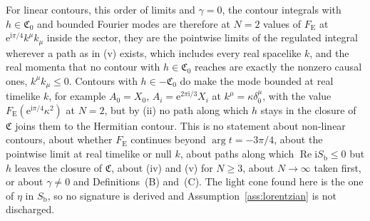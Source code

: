 For linear contours, this order of limits and \(\gamma=0\), the contour integrals with \(h\in\mathfrak C_0\) and bounded Fourier modes are therefore at \(N=2\) values of \(F_{\mathrm E}\) at \(\mathrm e^{\mathrm i\pi/4}k^\mu k_\mu\) inside the sector, they are the pointwise limits of the regulated integral wherever a path as in (v) exists, which includes every real spacelike \(k\), and the real momenta that no contour with \(h\in\mathfrak C_0\) reaches are exactly the nonzero causal ones, \(k^\mu k_\mu\le0\). Contours with \(h\in-\mathfrak C_0\) do make the mode bounded at real timelike \(k\), for example \(A_0=X_0\), \(A_i=\mathrm e^{2\pi\mathrm i/3}X_i\) at \(k^\mu=\kappa\delta^\mu_0\), with the value \(F_{\mathrm E}(\mathrm e^{\mathrm i\pi/4}\kappa^2)\) at \(N=2\), but by (ii) no path along which \(h\) stays in the closure of \(\mathfrak C\) joins them to the Hermitian contour. This is no statement about non-linear contours, about whether \(F_{\mathrm E}\) continues beyond \(\arg t=-3\pi/4\), about the pointwise limit at real timelike or null \(k\), about paths along which \(\operatorname{Re}\mathrm iS_{\mathrm b}\le0\) but \(h\) leaves the closure of \(\mathfrak C\), about (iv) and (v) for \(N\ge3\), about \(N\to\infty\) taken first, or about \(\gamma\neq0\) and Definitions~(B) and~(C). The light cone found here is the one of \(\eta\) in \(S_{\mathrm b}\), so no signature is derived and Assumption~\ref{ass:lorentzian} is not discharged.
